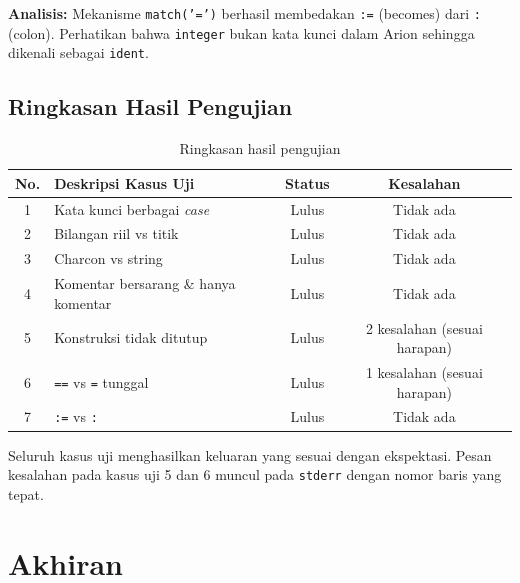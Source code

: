 \documentclass[12pt,a4paper]{article}
\begin{document}
\textbf{Analisis:} Mekanisme \texttt{match('=')} berhasil membedakan \texttt{:=} (becomes) dari \texttt{:} (colon). Perhatikan bahwa \texttt{integer} bukan kata kunci dalam Arion sehingga dikenali sebagai \texttt{ident}.

\subsection{Ringkasan Hasil Pengujian}

\begin{table}[H]
  \centering
  \begin{tabular}{clcc}
    \toprule
    \textbf{No.} & \textbf{Deskripsi Kasus Uji} & \textbf{Status} & \textbf{Kesalahan} \\
    \midrule
    1 & Kata kunci berbagai \textit{case}  & Lulus & Tidak ada \\
    2 & Bilangan riil vs titik             & Lulus & Tidak ada \\
    3 & Charcon vs string                  & Lulus & Tidak ada \\
    4 & Komentar bersarang \& hanya komentar & Lulus & Tidak ada \\
    5 & Konstruksi tidak ditutup            & Lulus & 2 kesalahan (sesuai harapan) \\
    6 & \texttt{==} vs \texttt{=} tunggal   & Lulus & 1 kesalahan (sesuai harapan) \\
    7 & \texttt{:=} vs \texttt{:}           & Lulus & Tidak ada \\
    \bottomrule
  \end{tabular}
  \caption{Ringkasan hasil pengujian}
\end{table}

Seluruh kasus uji menghasilkan keluaran yang sesuai dengan ekspektasi. Pesan kesalahan pada kasus uji 5 dan 6 muncul pada \texttt{stderr} dengan nomor baris yang tepat.

\section{Akhiran}
\end{document}
